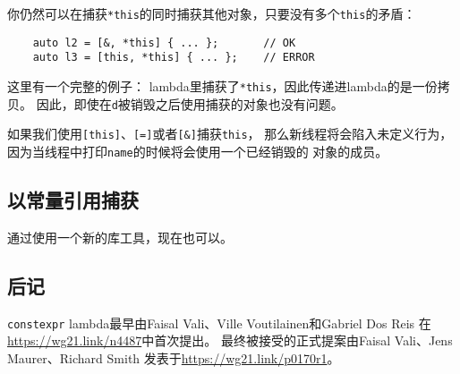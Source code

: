你仍然可以在捕获\texttt{*this}的同时捕获其他对象，只要没有多个\texttt{this}的矛盾：
\begin{lstlisting}
    auto l2 = [&, *this] { ... };       // OK
    auto l3 = [this, *this] { ... };    // ERROR
\end{lstlisting}
这里有一个完整的例子：
lambda里捕获了\texttt{*this}，因此传递进lambda的是一份拷贝。
因此，即使在\texttt{d}被销毁之后使用捕获的对象也没有问题。

如果我们使用\texttt{[this]}、\texttt{[=]}或者\texttt{[\&]}捕获\texttt{this}，
那么新线程将会陷入未定义行为，因为当线程中打印\texttt{name}的时候将会使用一个已经销毁的
对象的成员。

\subsection{以常量引用捕获}
通过使用一个新的库工具，现在也可以。

\subsection{后记}
\texttt{constexpr} lambda最早由Faisal Vali、Ville Voutilainen和Gabriel Dos Reis
在\url{https://wg21.link/n4487}中首次提出。
最终被接受的正式提案由Faisal Vali、Jens Maurer、Richard Smith
发表于\url{https://wg21.link/p0170r1}。

\setcounter{footnote}{0}